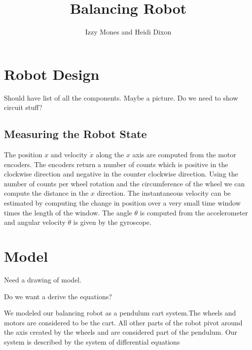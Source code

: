 \documentclass[]{article}
\title{Balancing Robot}
\author{Izzy Mones and Heidi Dixon}
\begin{document}
	\maketitle


 
\section*{Robot Design}
Should have list of all the components. Maybe a picture. Do we need to show circuit stuff?

\subsection*{Measuring the Robot State}
The position $x$ and velocity $\dot{x}$ along the $x$ axis are computed from the motor encoders. The encoders return a number of counts which is positive in the clockwise direction and negative in the counter clockwise direction. Using the number of counts per wheel rotation and the circumference of the wheel we can compute the distance in the $x$ direction. The instantaneous velocity can be estimated by computing the change in position over a very small time window times the length of the window. The angle $\theta$ is computed from the accelerometer and angular velocity $\dot{\theta}$ is given by the gyroscope.

\section*{Model}
Need a drawing of model.

Do we want a derive the equations?

We modeled our balancing robot as a pendulum cart system.The wheels and motors are considered to be the cart.  All other parts of the robot pivot around the axis created by the wheels and are considered part of the pendulum.   Our system is described by the system of differential equations
\end{document}
